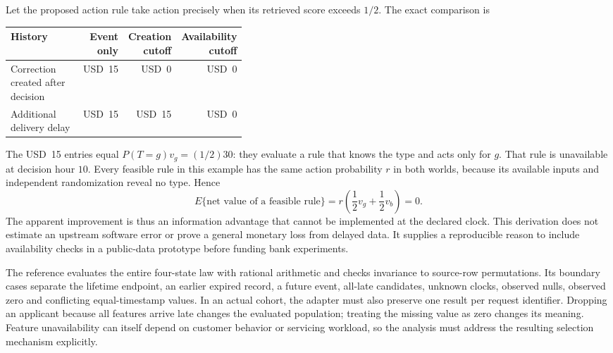 Let the proposed action rule take action precisely when its retrieved score
exceeds $1/2$. The exact comparison is
\begin{center}
\begin{tabular}{p{0.39\linewidth}rrr}
\toprule
History & Event only & Creation cutoff & Availability cutoff\\
\midrule
Correction created after decision & USD~15 & USD~0 & USD~0\\
Additional delivery delay & USD~15 & USD~15 & USD~0\\
\bottomrule
\end{tabular}
\end{center}
The USD~15 entries equal $P(T=g)v_g=(1/2)30$: they evaluate a rule that knows
the type and acts only for $g$. That rule is unavailable at decision hour
$10$. Every feasible rule in this example has the same action probability
$r$ in both worlds, because its available inputs and independent
randomization reveal no type. Hence
\begin{equation}
 E\{\text{net value of a feasible rule}\}
 =r\left(\frac12v_g+\frac12v_b\right)=0.
 \label{exec19:feast-feasible}
\end{equation}
The apparent improvement is thus an information advantage that cannot be
implemented at the declared clock. This derivation does not estimate an
upstream software error or prove a general monetary loss from delayed data.
It supplies a reproducible reason to include availability checks in a
public-data prototype before funding bank experiments.~\citep{exec19_feast_reference}

The reference evaluates the entire four-state law with rational arithmetic
and checks invariance to source-row permutations. Its boundary cases separate
the lifetime endpoint, an earlier expired record, a future event, all-late
candidates, unknown clocks, observed nulls, observed zero and conflicting
equal-timestamp values. In an actual cohort, the adapter must also preserve
one result per request identifier. Dropping an applicant because all features
arrive late changes the evaluated population; treating the missing value as
zero changes its meaning. Feature unavailability can itself depend on
customer behavior or servicing workload, so the analysis must address the
resulting selection mechanism explicitly.~\citep{exec19_feast_reference}

